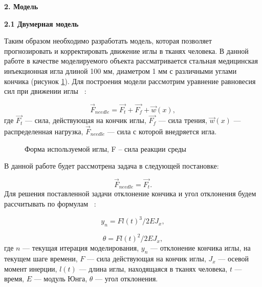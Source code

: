\documentclass[10pt]{article}
\begin{document}
\bigskip
\textbf{2. Модель}

\bigskip
\textbf{2.1 Двумерная модель}

\bigskip
Таким образом необходимо разработать модель, которая позволяет прогнозировать и корректировать движение иглы в тканях человека.  В данной работе в качестве моделируемого объекта рассматривается стальная медицинская инъекционная игла длиной 100 мм, диаметром 1 мм с различными углами кончика (рисунок \ref{n1}).
Для построения модели рассмотрим  уравнение равновесия сил при движении иглы ~\cite{Model}: 

\begin{equation} \label{eq1}
\Vec{F}_{needle} = \Vec{F_{t}} + \Vec{F_{f}} + \Vec{w}(x),
\end{equation}
где $\Vec{F_{t}}$ --- сила, действующая на кончик иглы, $\Vec{F_{f}}$ --- сила трения, $\Vec{w}(x)$ --- распределенная нагрузка, $\Vec{F}_{needle}$ --- сила с которой внедряется игла.

\begin{figure}[h]
\caption{Форма используемой иглы, F – сила реакции среды}
\label{n1}
\end{figure}

В данной работе будет рассмотрена  задача в следующей постановке:

\begin{equation} \label{eq2}
\Vec{F}_{needle} = \Vec{F_{t}}.
\end{equation}
Для решения поставленной задачи отклонение кончика и угол отклонения будем рассчитывать по формулам ~\cite{Model}:

\begin{equation} \label{eq3}
y_{n} = Fl(t)^3 / 2EJ_{x},
\end{equation}

\begin{equation} \label{eq4}
\theta = Fl(t)^2 / 2EJ_{x},
\end{equation}
где $n$ --- текущая итерация моделирования, $y_{n}$ --- отклонение кончика иглы, на текущем шаге времени,
$F$ --- сила действующая на кончик иглы, $J_{x}$ --- осевой момент инерции, 
$l(t)$ --- длина иглы, находящаяся в тканях человека, $t$ --- время, $E$ --- модуль Юнга, $\theta$ --- угол отклонения.
\end{document}
